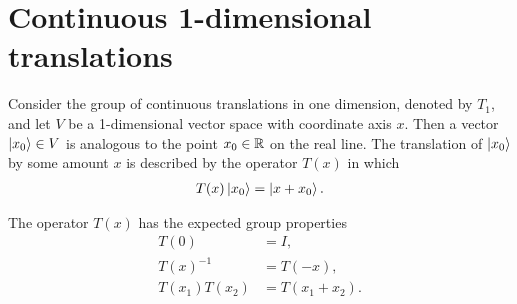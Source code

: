 \section{Continuous 1-dimensional translations}

Consider the group of continuous translations in one dimension, denoted by $T_1$, and let $V$ be a 1-dimensional vector space with coordinate axis $x$. Then a vector $\ket{x_0}\in V$ is analogous to the point $x_0\in\mathbb{R}$ on the real line. The translation of $\ket{x_0}$ by some amount $x$ is described by the operator $T(x)$ in which
\begin{align}
    T(x)\ket{x_0} = \ket{x+x_0}.
\end{align}

The operator $T(x)$ has the expected group properties
\begin{align}
    T(0) &= I, \label{eq:P_BC} \\
    T(x)^{-1} &= T(-x), \label{eq:P_inv}\\
    T(x_1)T(x_2) &= T(x_1+x_2).\label{eq:P_add}
\end{align}

